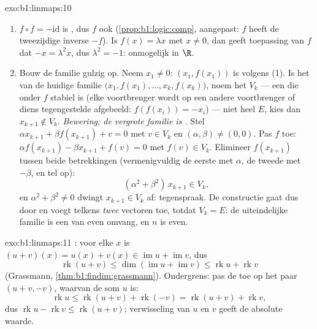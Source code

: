 \begin{solution}{exo:b1:linmaps:10}
\begin{enumerate}
  \item $f \circ f = -\mathrm{id}$ is , dus $f$ ook
        (\cref{prop:b1:logic:comp}, aangepast: $f$ heeft de
        tweezijdige inverse $-f$). Is $f(x) = \lambda x$ met $x
        \neq 0$, dan geeft toepassing van $f$ dat $-x = \lambda^2
        x$, dus $\lambda^2 = -1$: onmogelijk in $\R$.
  \item Bouw de familie gulzig op. Neem $x_1 \neq 0$: $(x_1,
        f(x_1))$ is  volgens (1). Is het  van de
        huidige familie $\bigl(x_1, f(x_1), \dots, x_k,
        f(x_k)\bigr)$, noem het $V_k$ --- een  die onder
        $f$ stabiel is (elke voortbrenger wordt op een andere
        voortbrenger of diens tegengestelde afgebeeld: $f(f(x_i)) =
        -x_i$) --- niet heel $E$, kies dan $x_{k+1} \notin V_k$.
        \emph{Bewering: de vergrote familie is .} Stel $\alpha
        x_{k+1} + \beta f(x_{k+1}) + v = 0$ met $v \in V_k$ en
        $(\alpha, \beta) \neq (0,0)$. Pas $f$ toe: $\alpha
        f(x_{k+1}) - \beta x_{k+1} + f(v) = 0$ met $f(v) \in V_k$.
        Elimineer $f(x_{k+1})$ tussen beide betrekkingen
        (vermenigvuldig de eerste met $\alpha$, de tweede met
        $-\beta$, en tel op):
        \[
        (\alpha^2 + \beta^2)\, x_{k+1} \in V_k ,
        \]
        en $\alpha^2 + \beta^2 \neq 0$ dwingt $x_{k+1} \in V_k$ af:
        tegenspraak. De constructie gaat dus door en voegt telkens
        \emph{twee} vectoren toe, totdat $V_k = E$: de uiteindelijke
        familie is een  van even omvang, en $n$ is even.
\end{enumerate}
\end{solution}

\begin{solution}{exo:b1:linmaps:11}
: voor elke $x$ is $(u + v)(x) = u(x) + v(x) \in
\operatorname{im} u + \operatorname{im} v$, dus
\[
\operatorname{rk}(u + v)
\leq \dim(\operatorname{im} u + \operatorname{im} v)
\leq \operatorname{rk} u + \operatorname{rk} v
\]
(Grassmann, \cref{thm:b1:findim:grassmann}). Ondergrens: pas de
 toe op het paar $(u + v, -v)$, waarvan de som $u$ is:
\[
\operatorname{rk} u \leq \operatorname{rk}(u + v) +
\operatorname{rk}(-v) = \operatorname{rk}(u + v) +
\operatorname{rk} v,
\]
dus $\operatorname{rk} u - \operatorname{rk} v \leq
\operatorname{rk}(u+v)$; verwisseling van $u$ en $v$ geeft de
absolute waarde.
\end{solution}

